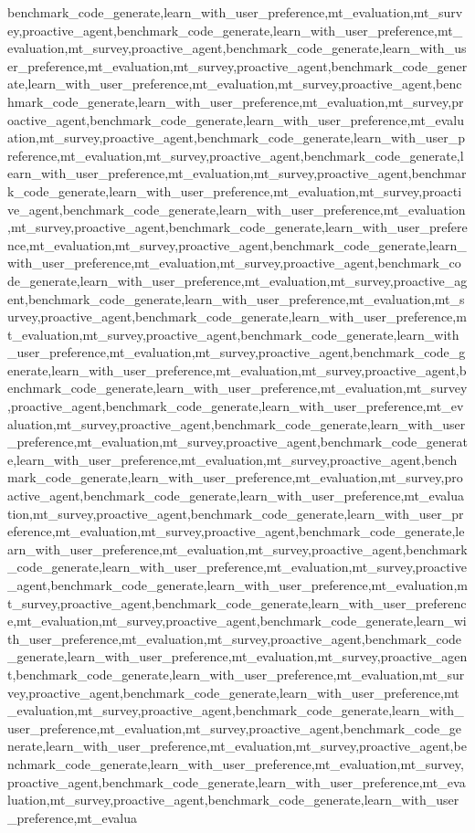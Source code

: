 benchmark_code_generate,learn_with_user_preference,mt_evaluation,mt_survey,proactive_agent,benchmark_code_generate,learn_with_user_preference,mt_evaluation,mt_survey,proactive_agent,benchmark_code_generate,learn_with_user_preference,mt_evaluation,mt_survey,proactive_agent,benchmark_code_generate,learn_with_user_preference,mt_evaluation,mt_survey,proactive_agent,benchmark_code_generate,learn_with_user_preference,mt_evaluation,mt_survey,proactive_agent,benchmark_code_generate,learn_with_user_preference,mt_evaluation,mt_survey,proactive_agent,benchmark_code_generate,learn_with_user_preference,mt_evaluation,mt_survey,proactive_agent,benchmark_code_generate,learn_with_user_preference,mt_evaluation,mt_survey,proactive_agent,benchmark_code_generate,learn_with_user_preference,mt_evaluation,mt_survey,proactive_agent,benchmark_code_generate,learn_with_user_preference,mt_evaluation,mt_survey,proactive_agent,benchmark_code_generate,learn_with_user_preference,mt_evaluation,mt_survey,proactive_agent,benchmark_code_generate,learn_with_user_preference,mt_evaluation,mt_survey,proactive_agent,benchmark_code_generate,learn_with_user_preference,mt_evaluation,mt_survey,proactive_agent,benchmark_code_generate,learn_with_user_preference,mt_evaluation,mt_survey,proactive_agent,benchmark_code_generate,learn_with_user_preference,mt_evaluation,mt_survey,proactive_agent,benchmark_code_generate,learn_with_user_preference,mt_evaluation,mt_survey,proactive_agent,benchmark_code_generate,learn_with_user_preference,mt_evaluation,mt_survey,proactive_agent,benchmark_code_generate,learn_with_user_preference,mt_evaluation,mt_survey,proactive_agent,benchmark_code_generate,learn_with_user_preference,mt_evaluation,mt_survey,proactive_agent,benchmark_code_generate,learn_with_user_preference,mt_evaluation,mt_survey,proactive_agent,benchmark_code_generate,learn_with_user_preference,mt_evaluation,mt_survey,proactive_agent,benchmark_code_generate,learn_with_user_preference,mt_evaluation,mt_survey,proactive_agent,benchmark_code_generate,learn_with_user_preference,mt_evaluation,mt_survey,proactive_agent,benchmark_code_generate,learn_with_user_preference,mt_evaluation,mt_survey,proactive_agent,benchmark_code_generate,learn_with_user_preference,mt_evaluation,mt_survey,proactive_agent,benchmark_code_generate,learn_with_user_preference,mt_evaluation,mt_survey,proactive_agent,benchmark_code_generate,learn_with_user_preference,mt_evaluation,mt_survey,proactive_agent,benchmark_code_generate,learn_with_user_preference,mt_evaluation,mt_survey,proactive_agent,benchmark_code_generate,learn_with_user_preference,mt_evaluation,mt_survey,proactive_agent,benchmark_code_generate,learn_with_user_preference,mt_evaluation,mt_survey,proactive_agent,benchmark_code_generate,learn_with_user_preference,mt_evaluation,mt_survey,proactive_agent,benchmark_code_generate,learn_with_user_preference,mt_evaluation,mt_survey,proactive_agent,benchmark_code_generate,learn_with_user_preference,mt_evaluation,mt_survey,proactive_agent,benchmark_code_generate,learn_with_user_preference,mt_evaluation,mt_survey,proactive_agent,benchmark_code_generate,learn_with_user_preference,mt_evaluation,mt_survey,proactive_agent,benchmark_code_generate,learn_with_user_preference,mt_evaluation,mt_survey,proactive_agent,benchmark_code_generate,learn_with_user_preference,mt_evalua